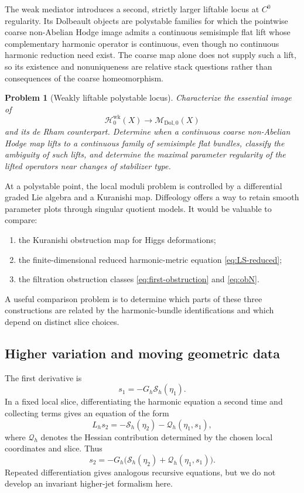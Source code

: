 \documentclass[11pt,reqno]{amsart}
\newtheorem{problem}[theorem]{Problem}
\theoremstyle{definition}
\theoremstyle{remark}
\newcommand{\cQ}{\mathcal Q}
\newcommand{\cS}{\mathcal S}
\newcommand{\Dol}{\mathrm{Dol}}
\begin{document}
The weak mediator introduces a second, strictly larger liftable locus at $C^0$ regularity.  Its Dolbeault objects are polystable families for which the pointwise coarse non-Abelian Hodge image admits a continuous semisimple flat lift whose complementary harmonic operator is continuous, even though no continuous harmonic reduction need exist.  The coarse map alone does not supply such a lift, so its existence and nonuniqueness are relative stack questions rather than consequences of the coarse homeomorphism.

\begin{problem}[Weakly liftable polystable locus]\label{prob:weak-liftable-locus}
Characterize the essential image of
\[
  \mathscr H^{\mathrm{wk}}_0(X)
  \longrightarrow
  \mathscr M_{\Dol,0}(X)
\]
and its de Rham counterpart.  Determine when a continuous coarse non-Abelian Hodge map lifts to a continuous family of semisimple flat bundles, classify the ambiguity of such lifts, and determine the maximal parameter regularity of the lifted operators near changes of stabilizer type.
\end{problem}


At a polystable point, the local moduli problem is controlled by a differential graded Lie algebra and a Kuranishi map.  Diffeology offers a way to retain smooth parameter plots through singular quotient models.  It would be valuable to compare:
\begin{enumerate}[label=(\roman*)]
\item the Kuranishi obstruction map for Higgs deformations;
\item the finite-dimensional reduced harmonic-metric equation \eqref{eq:LS-reduced};
\item the filtration obstruction classes \eqref{eq:first-obstruction} and \eqref{eq:obN}.
\end{enumerate}
A useful comparison problem is to determine which parts of these three constructions are related by the harmonic-bundle identifications and which depend on distinct slice choices.

\subsection{Higher variation and moving geometric data}

The first derivative is
\[
  s_1=-G_h\cS_h(\eta_1).
\]
In a fixed local slice, differentiating the harmonic equation a second time and collecting terms gives an equation of the form
\begin{equation}\label{eq:second-metric-variation}
  L_hs_2
  =-\cS_h(\eta_2)-\cQ_h(\eta_1,s_1),
\end{equation}
where $\cQ_h$ denotes the Hessian contribution determined by the chosen local coordinates and slice.  Thus
\[
  s_2=-G_h\bigl(\cS_h(\eta_2)+\cQ_h(\eta_1,s_1)\bigr).
\]
Repeated differentiation gives analogous recursive equations, but we do not develop an invariant higher-jet formalism here.
\end{document}
